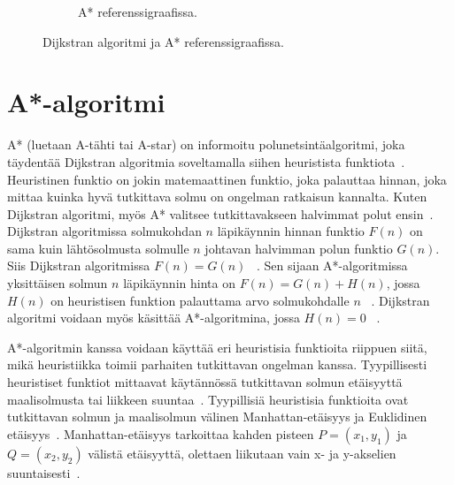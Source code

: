 \begin{figure}
\begin{subfigure}[b]{0.5\textwidth}
		\caption{A* referenssigraafissa.}\label{refAStar}
	\end{subfigure}
	\caption{Dijkstran algoritmi ja A* referenssigraafissa.}\label{DijkstraAStarFigs}
\end{figure}

\section{A*-algoritmi}\label{aStar}
A* (luetaan A-tähti tai A-star) on informoitu polunetsintäalgoritmi, joka 
täydentää Dijkstran algoritmia soveltamalla siihen heuristista 
funktiota~\cite{MathewAndMalathy}. Heuristinen funktio on jokin matemaattinen 
funktio, joka palauttaa hinnan, joka mittaa kuinka hyvä tutkittava solmu on 
ongelman ratkaisun kannalta. Kuten Dijkstran algoritmi, myös A* valitsee 
tutkittavakseen halvimmat polut ensin~\cite{DelaunayVoronoiAStar}. Dijkstran 
algoritmissa solmukohdan $n$ läpikäynnin hinnan funktio $F(n)$ on sama kuin 
lähtösolmusta solmulle $n$ johtavan halvimman polun funktio $G(n)$. Siis 
Dijkstran algoritmissa $F(n) = G(n)$ ~\cite{MathewAndMalathy}. Sen sijaan 
A*-algoritmissa yksittäisen solmun $n$ läpikäynnin hinta on 
$F(n) = G(n) + H(n)$, jossa $H(n)$ on heuristisen funktion palauttama arvo 
solmukohdalle $n$ ~\cite{DelaunayVoronoiAStar}. Dijkstran algoritmi voidaan myös 
käsittää A*-algoritmina, jossa $H(n) = 0$ ~\cite{MathewAndMalathy}.\par 
	A*-algoritmin kanssa voidaan käyttää eri heuristisia funktioita 
riippuen siitä, mikä heuristiikka toimii parhaiten tutkittavan ongelman 
kanssa. Tyypillisesti heuristiset funktiot mittaavat käytännössä tutkittavan 
solmun etäisyyttä maalisolmusta tai liikkeen suuntaa~\cite{ProcediaAStar}. 
Tyypillisiä heuristisia funktioita ovat tutkittavan solmun ja maalisolmun 
välinen Manhattan-etäisyys ja Euklidinen etäisyys~\cite{MathewAndMalathy}. 
Manhattan-etäisyys tarkoittaa kahden pisteen $P = (x_1,y_1)$ ja 
$Q = (x_2,y_2)$ välistä etäisyyttä, olettaen liikutaan vain x- ja 
y-akselien suuntaisesti~\cite{MathewAndMalathy}.

